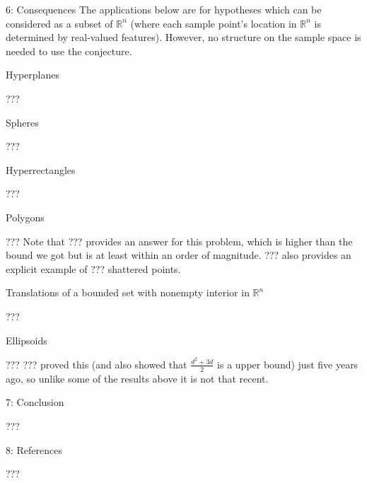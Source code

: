 \documentclass{article}
\begin{document}
6: Consequences
The applications below are for hypotheses which can be considered as a subset of $\mathbb{R}^n$ (where each sample point's location in $\mathbb{R}^n$ is determined by real-valued features). However, no structure on the sample space is needed to use the conjecture.

Hyperplanes

???

Spheres

???

Hyperrectangles

???

Polygons

??? Note that ??? provides an answer for this problem, which is higher than the bound we got but is at least within an order of magnitude. ??? also provides an explicit example of ??? shattered points.

Translations of a bounded set with nonempty interior in $\mathbb{R}^n$

???

Ellipsoids

??? ??? proved this (and also showed that $\frac{d^2 + 3d}{2}$ is a upper bound) just five years ago, so unlike some of the results above it is not that recent.

7: Conclusion

???

8: References

???
\end{document}
